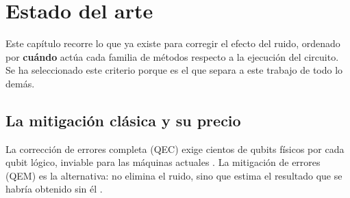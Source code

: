 \chapter{Estado del arte}
\label{cap:sota}

%
%
%
%
%

Este capítulo recorre lo que ya existe para corregir el efecto del ruido, ordenado por
\textbf{cuándo} actúa cada familia de métodos respecto a la ejecución del circuito. Se ha seleccionado
este criterio porque es el que separa a este trabajo de todo lo demás.

\section{La mitigación clásica y su precio}
\label{sec:qem_clasico}

La corrección de errores completa (QEC) exige cientos de qubits físicos por cada qubit
lógico, inviable para las máquinas actuales \cite{preskill2018nisq}. La
mitigación de errores (QEM) es la alternativa: no elimina el ruido, sino que
estima el resultado que se habría obtenido sin él \cite{cai2023quantum}.

